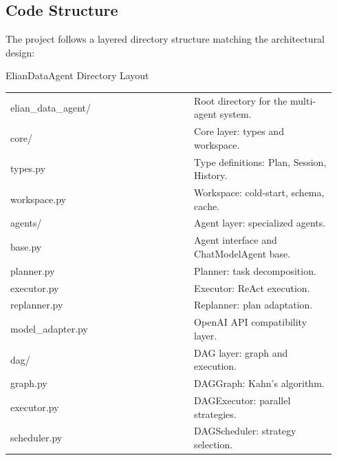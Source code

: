 \documentclass{article}
\theoremstyle{definition}
\begin{document}
\subsection{Code Structure}

The project follows a layered directory structure matching the architectural design:

\begin{layoutbox}{ElianDataAgent Directory Layout}
\small
\begin{tabular}{p{0.53\linewidth} p{0.41\linewidth}}
\ttfamily
elian\_data\_agent/ & Root directory for the multi-agent system. \\
\ttfamily\hspace*{1em}core/ & Core layer: types and workspace. \\
\ttfamily\hspace*{2em}types.py & Type definitions: Plan, Session, History. \\
\ttfamily\hspace*{2em}workspace.py & Workspace: cold-start, schema, cache. \\
\ttfamily\hspace*{1em}agents/ & Agent layer: specialized agents. \\
\ttfamily\hspace*{2em}base.py & Agent interface and ChatModelAgent base. \\
\ttfamily\hspace*{2em}planner.py & Planner: task decomposition. \\
\ttfamily\hspace*{2em}executor.py & Executor: ReAct execution. \\
\ttfamily\hspace*{2em}replanner.py & Replanner: plan adaptation. \\
\ttfamily\hspace*{2em}model\_adapter.py & OpenAI API compatibility layer. \\
\ttfamily\hspace*{1em}dag/ & DAG layer: graph and execution. \\
\ttfamily\hspace*{2em}graph.py & DAGGraph: Kahn's algorithm. \\
\ttfamily\hspace*{2em}executor.py & DAGExecutor: parallel strategies. \\
\ttfamily\hspace*{2em}scheduler.py & DAGScheduler: strategy selection. \\

\end{tabular}
\end{layoutbox}
\end{document}
